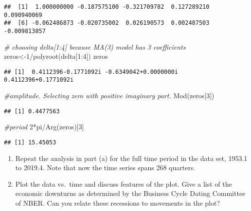 \documentclass[
]{article}
\newenvironment{Shaded}{\begin{snugshade}}{\end{snugshade}}
\newcommand{\CommentTok}[1]{\textcolor[rgb]{0.56,0.35,0.01}{\textit{#1}}}
\newcommand{\DecValTok}[1]{\textcolor[rgb]{0.00,0.00,0.81}{#1}}
\newcommand{\FunctionTok}[1]{\textcolor[rgb]{0.00,0.00,0.00}{#1}}
\newcommand{\NormalTok}[1]{#1}
\newcommand{\OtherTok}[1]{\textcolor[rgb]{0.56,0.35,0.01}{#1}}
\newcommand{\SpecialCharTok}[1]{\textcolor[rgb]{0.00,0.00,0.00}{#1}}
\begin{document}
\begin{verbatim}
##  [1]  1.000000000 -0.187575100 -0.321709782  0.127289210  0.090940069
##  [6] -0.062486873 -0.020735002  0.026190573  0.002487503 -0.009813857
\end{verbatim}

\begin{Shaded}
\begin{Highlighting}[]
\CommentTok{\# choosing delta[1:4] because MA(3) model has 3 coefficients}
\NormalTok{zeros}\OtherTok{\textless{}{-}}\DecValTok{1}\SpecialCharTok{/}\FunctionTok{polyroot}\NormalTok{(delta[}\DecValTok{1}\SpecialCharTok{:}\DecValTok{4}\NormalTok{])}
\NormalTok{zeros}
\end{Highlighting}
\end{Shaded}

\begin{verbatim}
## [1]  0.4112396-0.1771092i -0.6349042+0.0000000i  0.4112396+0.1771092i
\end{verbatim}

\begin{Shaded}
\begin{Highlighting}[]
\CommentTok{\#amplitude. Selecting zero with positive imaginary part.}
\FunctionTok{Mod}\NormalTok{(zeros[}\DecValTok{3}\NormalTok{])}
\end{Highlighting}
\end{Shaded}

\begin{verbatim}
## [1] 0.4477563
\end{verbatim}

\begin{Shaded}
\begin{Highlighting}[]
\CommentTok{\#period}
\DecValTok{2}\SpecialCharTok{*}\NormalTok{pi}\SpecialCharTok{/}\FunctionTok{Arg}\NormalTok{(zeros)[}\DecValTok{3}\NormalTok{]}
\end{Highlighting}
\end{Shaded}

\begin{verbatim}
## [1] 15.45053
\end{verbatim}

\begin{enumerate}
\def\labelenumi{(\alph{enumi})}
\setcounter{enumi}{1}
\item
  Repeat the analysis in part (a) for the full time period in the data
  set, 1953.1 to 2019.4. Note that now the time series spans 268
  quarters.
\item
  Plot the data vs.~time and discuss features of the plot. Give a list
  of the economic downturns as determined by the Business Cycle Dating
  Committee of NBER. Can you relate these recessions to movements in the
  plot?
\end{enumerate}
\end{document}

